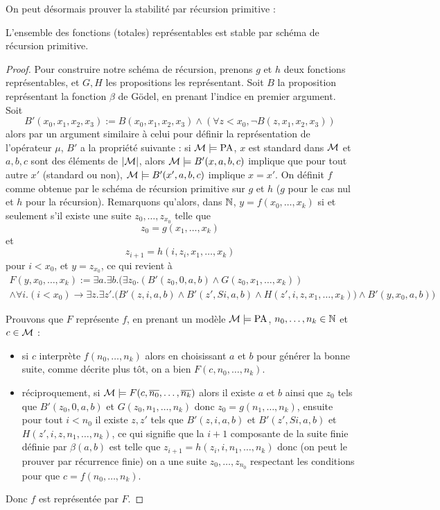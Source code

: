 On peut désormais prouver la stabilité par récursion primitive :

\begin{lem}
    L'ensemble des fonctions (totales) représentables est stable par schéma de récursion primitive.
\end{lem}

\begin{proof}
    Pour construire notre schéma de récursion, prenons $g$ et $h$ deux fonctions représentables, et $G,H$ les propositions les représentant. Soit $B$ la proposition représentant la fonction $\beta$ de Gödel, en prenant l'indice en premier argument. Soit $$B'(x_0,x_1,x_2,x_3) := B(x_0,x_1,x_2,x_3)\land (\forall z < x_0, \lnot B(z,x_1,x_2,x_3))$$ alors par un argument similaire à celui pour définir la représentation de l'opérateur $\mu$, $B'$ a la propriété suivante : si $\mathcal M\models \mathrm{PA}$, $x$ est standard dans $\mathcal M$ et $a,b,c$ sont des éléments de $|\mathcal M|$, alors $\mathcal M\models B'(x,a,b,c)$ implique que pour tout autre $x'$ (standard ou non), $\mathcal M\models B'(x',a,b,c)$ implique $x=x'$. On définit $f$ comme obtenue par le schéma de récursion primitive sur $g$ et $h$ ($g$ pour le cas nul et $h$ pour la récursion). Remarquons qu'alors, dans $\mathbb{N}$, $y=f(x_0,\ldots,x_k)$ si et seulement s'il existe une suite $z_0,\ldots,z_{x_0}$ telle que $$z_0 = g(x_1,\ldots,x_k)$$ et $$z_{i+1} = h(i,z_i,x_1,\ldots,x_k)$$ pour $i<x_0$, et $y=z_{x_0}$, ce qui revient à \begin{multline*}
        F(y,x_0,\ldots,x_k) := \exists a.\exists b. \Bigg( \exists z_0. (B'(z_0,0,a,b)\land G(z_0,x_1,\ldots,x_k)) \\ 
        \land \forall i. (i<x_0) \to \exists z.\exists z'. \big( B'(z,i,a,b)\land B'(z',Si,a,b)\land H(z',i,z,x_1,\ldots,x_k) \big) \land B'(y,x_0,a,b)
        \Bigg)
    \end{multline*}

    Prouvons que $F$ représente $f$, en prenant un modèle $\mathcal M\models \mathrm{PA}$, $n_0,\ldots,n_k\in\mathbb{N}$ et $c\in\mathcal M$ :
    \begin{itemize}[label=$\bullet$]
        \item si $c$ interprète $f(n_0,\ldots,n_k)$ alors en choisissant $a$ et $b$ pour générer la bonne suite, comme décrite plus tôt, on a bien $F(c,n_0,\ldots,n_k)$.
        \item réciproquement, si $\mathcal M\models F(c,\overline{n_0},\ldots,\overline{n_k})$ alors il existe $a$ et $b$ ainsi que $z_0$ tels que $B'(z_0,0,a,b)$ et $G(z_0,n_1,\ldots,n_k)$ donc $z_0=g(n_1,\ldots,n_k)$, ensuite pour tout $i < n_0$ il existe $z,z'$ tels que $B'(z,i,a,b)$ et $B'(z',Si,a,b)$ et $H(z',i,z,n_1,\ldots,n_k)$, ce qui signifie que la $i+1$\ieme{} composante de la suite finie définie par $\beta(a,b)$ est telle que $z_{i+1}=h(z_i,i,n_1,\ldots,n_k)$ donc (on peut le prouver par récurrence finie) on a une suite $z_0,\ldots,z_{n_0}$ respectant les conditions pour que $c=f(n_0,\ldots,n_k)$.
    \end{itemize}

    Donc $f$ est représentée par $F$.
\end{proof}

